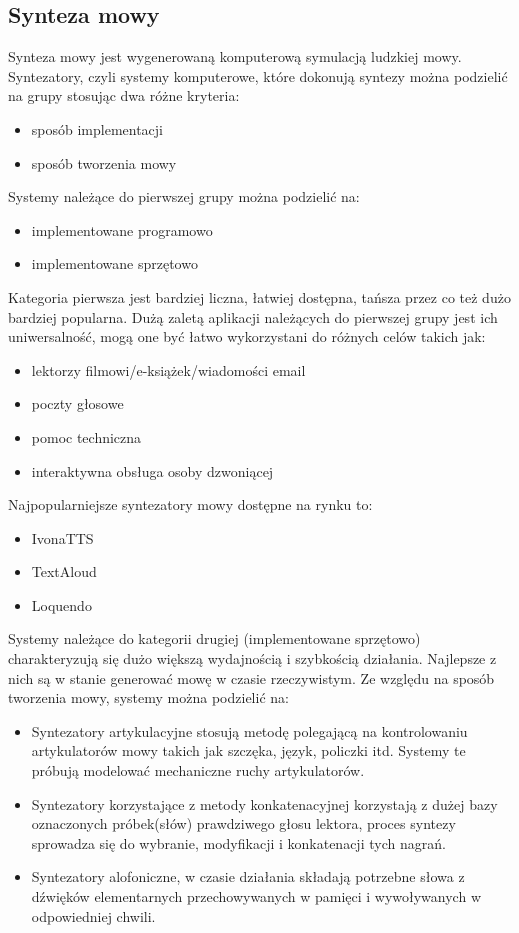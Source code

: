\subsection{Synteza mowy}   
Synteza mowy jest wygenerowaną komputerową symulacją ludzkiej mowy. Syntezatory, czyli systemy komputerowe, które dokonują syntezy można podzielić na grupy stosując dwa różne kryteria:
\begin{itemize}
	\item sposób implementacji
	\item sposób tworzenia mowy
\end{itemize}
Systemy należące do pierwszej grupy można podzielić na:
\begin{itemize}
	\item implementowane programowo
	\item implementowane sprzętowo
\end{itemize}
Kategoria pierwsza jest bardziej liczna, łatwiej dostępna, tańsza przez co też dużo bardziej popularna. Dużą zaletą aplikacji należących do pierwszej grupy jest ich uniwersalność,  mogą one być łatwo wykorzystani do różnych celów takich jak:
\begin{itemize}
	\item lektorzy filmowi/e-książek/wiadomości email
	\item poczty głosowe
	\item pomoc techniczna
	\item interaktywna obsługa osoby  dzwoniącej
\end{itemize}
Najpopularniejsze syntezatory mowy dostępne na rynku to:
\begin{itemize}
	\item IvonaTTS
	\item TextAloud
	\item Loquendo
\end{itemize}
Systemy należące do kategorii drugiej (implementowane sprzętowo) charakteryzują się dużo większą wydajnością i szybkością działania. Najlepsze z nich są w stanie generować mowę w czasie rzeczywistym. 
Ze względu na sposób tworzenia mowy, systemy można podzielić na:
\begin{itemize}
	\item Syntezatory artykulacyjne stosują metodę polegającą na kontrolowaniu artykulatorów mowy takich jak szczęka, język, policzki itd. Systemy te próbują modelować mechaniczne ruchy artykulatorów.
	\item Syntezatory korzystające z metody konkatenacyjnej korzystają z dużej bazy oznaczonych próbek(słów) prawdziwego głosu lektora, proces syntezy sprowadza się do wybranie, modyfikacji i konkatenacji tych nagrań. 
	\item Syntezatory alofoniczne, w czasie działania składają potrzebne słowa z dźwięków elementarnych przechowywanych w pamięci i wywoływanych w odpowiedniej chwili. 
\end{itemize}
